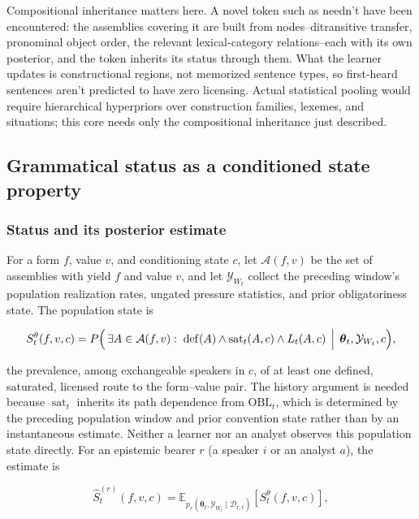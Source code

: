 Compositional inheritance matters here. A novel token such as  needn't have been encountered: the assemblies covering it
are built from nodes--ditransitive transfer, pronominal object order, the relevant
lexical-category relations--each with its own posterior, and the token inherits its
status through them. What the learner updates is constructional regions, not
memorized sentence types, so first-heard sentences aren't predicted to have zero
licensing. Actual statistical pooling would require hierarchical hyperpriors
over construction families, lexemes, and situations; this core needs only
the compositional inheritance just described.

\subsection{Grammatical status as a conditioned state property}
\label{sec:objective-G}

\subsubsection{Status and its posterior estimate}
\label{sec:posterior-existence}

For a form $f$, value $v$, and conditioning state $c$, let $\mathcal{A}(f,v)$ be
the set of assemblies with yield $f$ and value $v$, and let
$\mathcal Y_{W_t}$ collect the preceding window's population realization rates,
ungated pressure statistics, and prior obligatoriness state. The population
state is

\begin{equation}
S_t^{\theta}(f,v,c)=
P\Bigl(\,\exists A\in\mathcal{A}(f,v):\;
\operatorname{def}(A)\wedge\operatorname{sat}_t(A,c)\wedge L_t(A,c)
\,\Bigm|\,\boldsymbol{\theta}_t,\mathcal Y_{W_t},c\Bigr),
\label{eq:Gtheta}
\end{equation}

\noindent the prevalence, among exchangeable speakers in $c$, of at least one
defined, saturated, licensed route to the form--value pair. The history argument
is needed because $\operatorname{sat}_t$ inherits its path dependence from
$\mathrm{OBL}_t$, which is determined
by the preceding population window and prior convention state rather than by an
instantaneous estimate.
Neither a learner nor an analyst observes this population state directly. For
an epistemic bearer $r$ (a speaker $i$ or an analyst $a$), the estimate is

\begin{equation}
\widehat{S}^{(r)}_t(f,v,c)=
\mathbb{E}_{p_r(\boldsymbol{\theta}_t,\mathcal Y_{W_t}\mid\mathcal{D}_{r,t})}
\!\left[S_t^{\theta}(f,v,c)\right],
\label{eq:Gt}
\end{equation}

